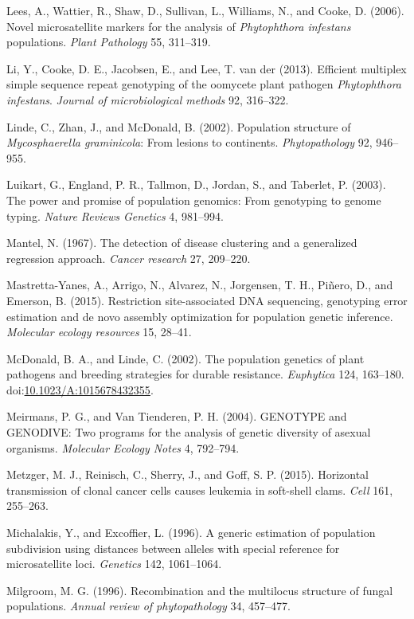 \documentclass{frontiersSCNS} %
\begin{document}
Lees, A., Wattier, R., Shaw, D., Sullivan, L., Williams, N., and Cooke,
D. (2006). Novel microsatellite markers for the analysis of
\emph{Phytophthora infestans} populations. \emph{Plant Pathology} 55,
311--319.

Li, Y., Cooke, D. E., Jacobsen, E., and Lee, T. van der (2013).
Efficient multiplex simple sequence repeat genotyping of the oomycete
plant pathogen \emph{Phytophthora infestans}. \emph{Journal of
microbiological methods} 92, 316--322.

Linde, C., Zhan, J., and McDonald, B. (2002). Population structure of
\emph{Mycosphaerella graminicola}: From lesions to continents.
\emph{Phytopathology} 92, 946--955.

Luikart, G., England, P. R., Tallmon, D., Jordan, S., and Taberlet, P.
(2003). The power and promise of population genomics: From genotyping to
genome typing. \emph{Nature Reviews Genetics} 4, 981--994.

Mantel, N. (1967). The detection of disease clustering and a generalized
regression approach. \emph{Cancer research} 27, 209--220.

Mastretta-Yanes, A., Arrigo, N., Alvarez, N., Jorgensen, T. H.,
Pi{\~{n}}ero, D., and Emerson, B. (2015). Restriction site-associated DNA
sequencing, genotyping error estimation and de novo assembly
optimization for population genetic inference. \emph{Molecular ecology
resources} 15, 28--41.

McDonald, B. A., and Linde, C. (2002). The population genetics of plant
pathogens and breeding strategies for durable resistance.
\emph{Euphytica} 124, 163--180.
doi:\href{http://dx.doi.org/10.1023/A:1015678432355}{10.1023/A:1015678432355}.

Meirmans, P. G., and Van Tienderen, P. H. (2004). GENOTYPE and GENODIVE:
Two programs for the analysis of genetic diversity of asexual organisms.
\emph{Molecular Ecology Notes} 4, 792--794.

Metzger, M. J., Reinisch, C., Sherry, J., and Goff, S. P. (2015).
Horizontal transmission of clonal cancer cells causes leukemia in
soft-shell clams. \emph{Cell} 161, 255--263.

Michalakis, Y., and Excoffier, L. (1996). A generic estimation of
population subdivision using distances between alleles with special
reference for microsatellite loci. \emph{Genetics} 142, 1061--1064.

Milgroom, M. G. (1996). Recombination and the multilocus structure of
fungal populations. \emph{Annual review of phytopathology} 34, 457--477.
\end{document}
